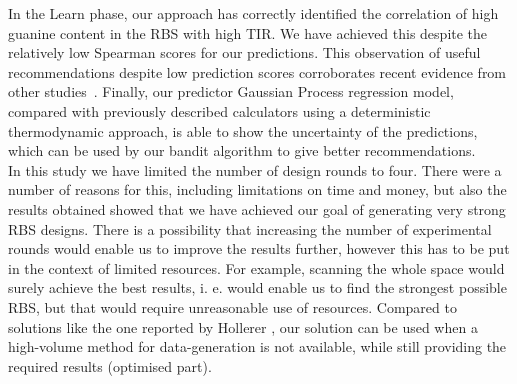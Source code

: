 \documentclass{article}
\begin{document}
In the Learn phase, our approach has correctly identified the correlation of high guanine content in the RBS with high TIR.
We have achieved this despite the relatively low Spearman scores for our predictions. This observation of useful recommendations despite low prediction scores corroborates recent evidence from other studies~\cite{Radivojevic2020, Opgenorth2019}.
Finally, our predictor Gaussian Process regression model, compared with previously described calculators using a deterministic thermodynamic approach, is able to show the uncertainty of the predictions, which can be used by our bandit algorithm to give better recommendations.\\

In this study we have limited the number of design rounds to four.
There were a number of reasons for this, including limitations on time and money, but also the results obtained showed that we have achieved our goal of generating very strong RBS designs.
There is a possibility that increasing the number of experimental rounds would enable us to improve the results further, however this has to be put in the context of limited resources.
For example, scanning the whole space would surely achieve the best results, i. e. would enable us to find the strongest possible RBS, but that would require unreasonable use of resources.
Compared to solutions like the one reported by Hollerer \cite{Hollerer2020}, our solution can be used when a high-volume method for data-generation is not available, while still providing the required results (optimised part). \\
\end{document}
